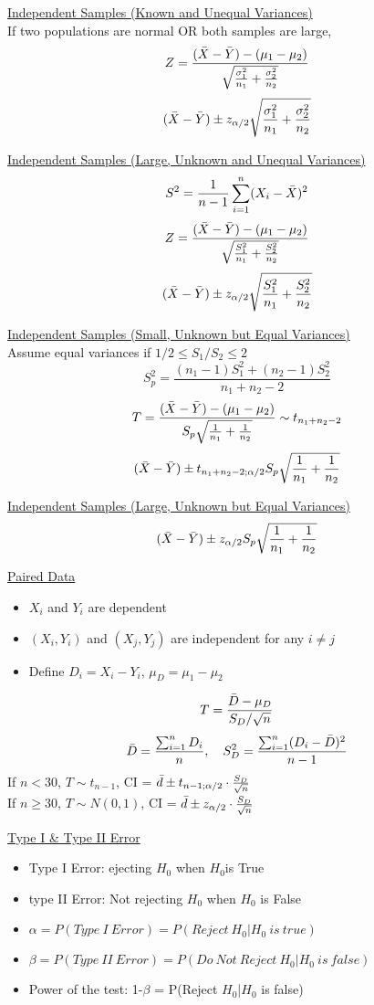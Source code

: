 \documentclass[a4paper,1pt,landscape]{article}
\begin{document}
\begin{multicols}{3}
\underline{Independent Samples (Known and Unequal Variances)}\\
If two populations are normal OR both samples are large,
$$Z = \frac{(\Bar{X}-\Bar{Y}) - (\mu_1 - \mu_2)}{\sqrt{\frac{\sigma_1^2}{n_1} + \frac{\sigma_2^2}{n_2}}}$$
$$(\Bar{X} - \Bar{Y}) \pm z_{\alpha/2}\sqrt{\frac{\sigma_1^2}{n_1} + \frac{\sigma_2^2}{n_2}}$$

\underline{Independent Samples (Large, Unknown and Unequal Variances)}\\
$$S^2 = \frac{1}{n-1}\sum_{i=1}^n (X_i - \Bar{X})^2$$
$$Z = \frac{(\Bar{X}-\Bar{Y}) - (\mu_1 - \mu_2)}{\sqrt{\frac{S_1^2}{n_1} + \frac{S_2^2}{n_2}}}$$
$$(\Bar{X} - \Bar{Y}) \pm z_{\alpha/2}\sqrt{\frac{S_1^2}{n_1} + \frac{S_2^2}{n_2}}$$

\underline{Independent Samples (Small, Unknown but Equal Variances)}\\
Assume equal variances if $1/2 \leq S_1/S_2 \leq 2$
$$S_p^2 = \frac{(n_1-1)S_1^2 + (n_2-1)S_2^2}{n_1 + n_2 - 2}$$
$$T = \frac{(\Bar{X}-\Bar{Y}) - (\mu_1 - \mu_2)}{S_p\sqrt{\frac{1}{n_1} + \frac{1}{n_2}}}\sim t_{n_1+n_2-2}$$
$$(\Bar{X} - \Bar{Y}) \pm t_{n_1+n_2-2;\alpha/2}S_p\sqrt{\frac{1}{n_1} + \frac{1}{n_2}}$$

\underline{Independent Samples (Large, Unknown but Equal Variances)}\\
$$(\Bar{X} - \Bar{Y}) \pm z_{\alpha/2}S_p\sqrt{\frac{1}{n_1} + \frac{1}{n_2}}$$

\underline{Paired Data}\\
\begin{itemize}
    \item $X_i$ and $Y_i$ are dependent
    \item $(X_i, Y_i)$ and $(X_j, Y_j)$ are independent for any $i\neq j$
    \item Define $D_i = X_i - Y_i$, $\mu_D = \mu_1 - \mu_2$
\end{itemize}
$$T = \frac{\Bar{D}-\mu_D}{S_D/\sqrt{n}}$$
$$\Bar{D} = \frac{\sum_{i=1}^n D_i}{n}, \quad S_D^2 = \frac{\sum_{i=1}^n (D_i - \Bar{D})^2}{n-1}$$
If $n < 30$, $T\sim t_{n-1}$, CI = $\Bar{d} \pm t_{n-1;\alpha/2}\cdot\frac{S_D}{\sqrt{n}}$\\
If $n \geq 30$, $T\sim N(0,1)$, CI = $\Bar{d} \pm z_{\alpha/2}\cdot\frac{S_D}{\sqrt{n}}$

\underline{Type I \& Type II Error}
\begin{itemize}
    \item Type I Error: ejecting $H_0$ when $H_0$is True
    \item type II Error: Not rejecting $H_0$ when $H_0$ is False
    \item $\alpha = P(Type\ I\ Error) = P(Reject\ H_0|H_0\ is\ true)$
    \item $\beta = P(Type\ II\ Error) = P(Do\ Not\ Reject\ H_0|H_0\ is\ false)$
    \item Power of the test: 1-$\beta$ = P(Reject $H_0$|$H_0$ is false)
\end{itemize}


\end{multicols}
\end{document}
